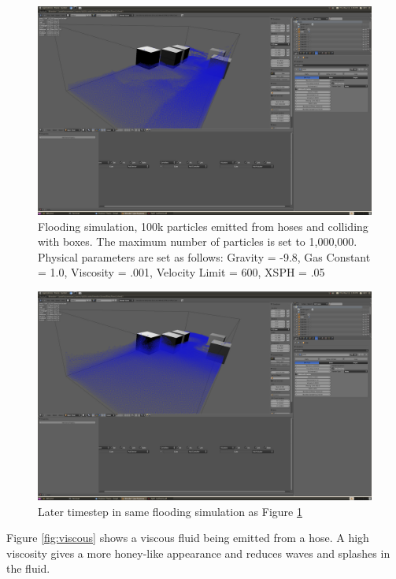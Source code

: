 \begin{figure}[!htc]
		\includegraphics[scale=0.4]{figures/flood1.png}
        \caption{ Flooding simulation, 100k particles emitted from hoses and
        colliding with boxes. The maximum number of particles is set to
        1,000,000. Physical parameters are set as follows: Gravity = -9.8, Gas
        Constant = 1.0, Viscosity = .001, Velocity Limit = 600, XSPH = .05}
		\label{fig:flood1}
\end{figure}

\pagebreak
\clearpage

\begin{figure}[!htc]
		\includegraphics[scale=0.4]{figures/flood2.png}
        \caption{ Later timestep in same flooding simulation as Figure \ref{fig:flood1} }
		\label{fig:flood2}
\end{figure}

\pagebreak
\clearpage

Figure \ref{fig:viscous} shows a viscous fluid being emitted from a hose. A
high viscosity gives a more honey-like appearance and reduces waves and
splashes in the fluid.

